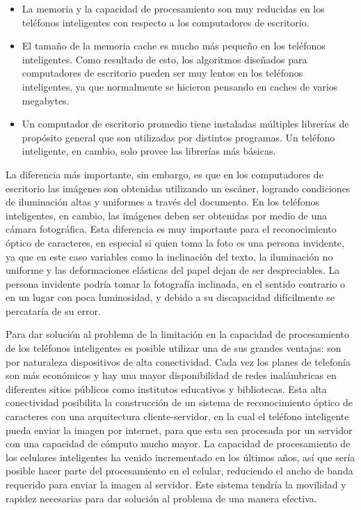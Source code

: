 \documentclass[a4paper, 11pt, oneside]{report}
\begin{document}
	\begin{itemize}

	\item La memoria y la capacidad de procesamiento son muy reducidas en los teléfonos inteligentes con respecto a los computadores de escritorio.

	\item El tamaño de la memoria cache es mucho más pequeño en los teléfonos inteligentes. Como resultado de esto, los algoritmos diseñados para computadores de escritorio pueden ser muy lentos en los teléfonos inteligentes, ya que normalmente se hicieron pensando en caches de varios megabytes.

	\item Un computador de escritorio promedio tiene instaladas múltiples librerías de propósito general que son utilizadas por distintos programas. Un teléfono inteligente, en cambio, solo provee las librerías más básicas.

	\end{itemize}

La diferencia más importante, sin embargo, es que en los computadores de escritorio las imágenes son obtenidas utilizando un escáner, logrando condiciones de iluminación altas y uniformes a través del documento. En los teléfonos inteligentes, en cambio, las imágenes deben ser obtenidas por medio de una cámara fotográfica. Esta diferencia es muy importante para el reconocimiento óptico de caracteres, en especial si quien toma la foto es una persona invidente, ya que en este caso variables como la inclinación del texto, la iluminación no uniforme y las deformaciones elásticas del papel dejan de ser despreciables. La persona invidente podría tomar la fotografía inclinada, en el sentido contrario o en un lugar con poca luminosidad, y debido a su discapacidad difícilmente se percataría de su error.

Para dar solución al problema de la limitación en la capacidad de procesamiento de los teléfonos inteligentes es posible utilizar una de sus grandes ventajas: son por naturaleza dispositivos de alta conectividad. Cada vez los planes de telefonía son más económicos y hay una mayor disponibilidad de redes inalámbricas en diferentes sitios públicos como institutos educativos y bibliotecas. Esta alta conectividad posibilita la construcción de un sistema de reconocimiento óptico de caracteres con una arquitectura cliente-servidor, en la cual el teléfono inteligente pueda enviar la imagen por internet, para que esta sea procesada por un servidor con una capacidad de cómputo mucho mayor. La capacidad de procesamiento de los celulares inteligentes ha venido incrementado en los últimos años, así que sería posible hacer parte del procesamiento en el celular, reduciendo el ancho de banda requerido para enviar la imagen al servidor. Este sistema tendría la movilidad y rapidez necesarias para dar solución al problema de una manera efectiva.
\end{document}
